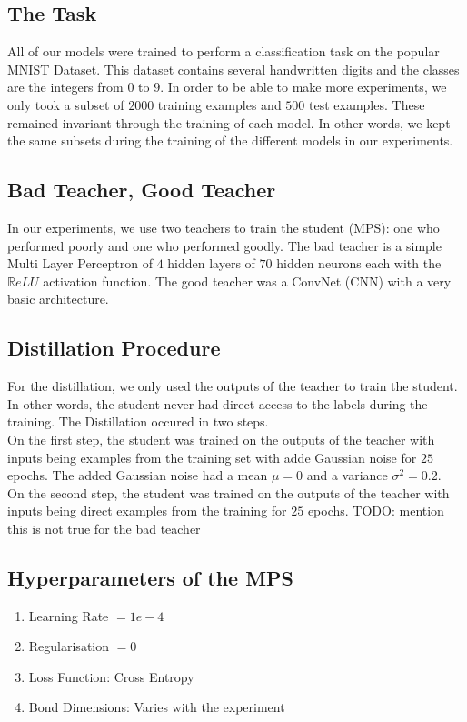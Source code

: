 \documentclass{article}
\theoremstyle{definition}
\theoremstyle{definition}
\begin{document}
\subsection{The Task}
All of our models were trained to perform a classification task on the popular MNIST Dataset. This dataset contains several handwritten digits and the classes are the integers from $0$ to $9$. In order to be able to make more experiments, we only took a subset of $2000$ training examples and $500$ test examples. These remained invariant through the training of each model. In other words, we kept the same subsets during the training of the different models in our experiments.

\subsection{Bad Teacher, Good Teacher}
In our experiments, we use two teachers to train the student (MPS): one who performed poorly and one who performed goodly.
The bad teacher is a simple Multi Layer Perceptron of $4$ hidden layers of $70$ hidden neurons each with the $\mathbb{R}eLU$ activation function.  The good teacher was a ConvNet (CNN) with a very basic architecture.


\subsection{Distillation Procedure}
For the distillation, we only used the outputs of the teacher to train the student. In other words, the student never had direct access to the labels during the training. The Distillation occured in two steps. \\ On the first step, the student was trained on the outputs of the teacher with inputs being examples from the training set with adde Gaussian noise for $25$ epochs. The added Gaussian noise had a mean $\mu=0$ and a variance $\sigma^2=0.2$. \\ On the second step, the student was trained on the outputs of the teacher with inputs being direct examples from the training for $25$ epochs.
TODO: mention this is not true for the bad teacher

\subsection{Hyperparameters of the MPS}
\begin{enumerate}
    \item Learning Rate $= 1e-4$
    \item Regularisation $= 0$
    \item Loss Function: Cross Entropy
    \item Bond Dimensions: Varies with the experiment
\end{enumerate}
\end{document}
